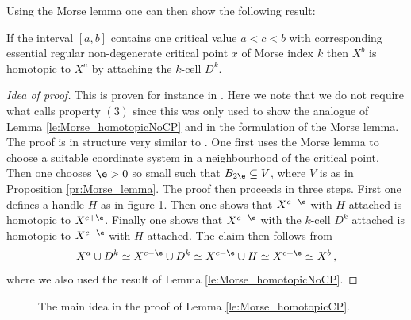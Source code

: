 Using the Morse lemma one can then show the following result:
\begin{lemma}
  \label{le:Morse_homotopicCP}
  If the interval $[a,b]$ contains one critical value $a<c<b$ with corresponding essential regular non-degenerate critical point
  $x$ of Morse index $k$
  then $X^b$ is homotopic to $X^a$ by attaching the $k$-cell
  $D^{k}$.
\end{lemma}
\begin{proof}[Idea of proof]
  This is proven for instance in \cite[Theorem 8]{Handron2002}.
  Here we note that we do not require what \cite{Handron2002} calls property $(3)$
  since this was only used to show the analogue of Lemma \ref{le:Morse_homotopicNoCP} and in the formulation of the
  Morse lemma.
  The proof is in structure very similar to \cite{Milnor1963}.
  One first uses the Morse lemma to choose a suitable coordinate system
  in a neighbourhood of the critical point.
  Then one chooses $\e>0$ so small such that $B_{2\e}\subseteq V$, where $V$ is as in Proposition \ref{pr:Morse_lemma}.
  The proof then proceeds in three steps.
  First one defines a handle $H$ as in figure \ref{fi:morseIneq_CP}.
  Then one shows that $X^{c-\e}$ with $H$ attached is homotopic to $X^{c+\e}$.
  Finally one shows that $X^{c-\e}$ with the $k$-cell $D^k$ attached is homotopic to
  $X^{c-\e}$ with $H$ attached.
  The claim then follows from
  \begin{align*}
    X^a\cup D^k
    \simeq X^{c-\e}\cup D^k
    \simeq X^{c-\e}\cup H
    \simeq X^{c+\e}
    \simeq X^b\,,
  \end{align*}
  where we also used the result of Lemma \ref{le:Morse_homotopicNoCP}.
\end{proof}
\begin{figure}
  \centering
  \begin{subfigure}{0.45\textwidth}
    \centering
    \def\svgwidth{\textwidth}
    
  \end{subfigure}
  \hfill
  \begin{subfigure}{0.45\textwidth}
    \centering
    \def\svgwidth{\textwidth}
    
  \end{subfigure}
  \caption{The main idea in the proof of Lemma \ref{le:Morse_homotopicCP}.}
  \label{fi:morseIneq_CP}
\end{figure}

